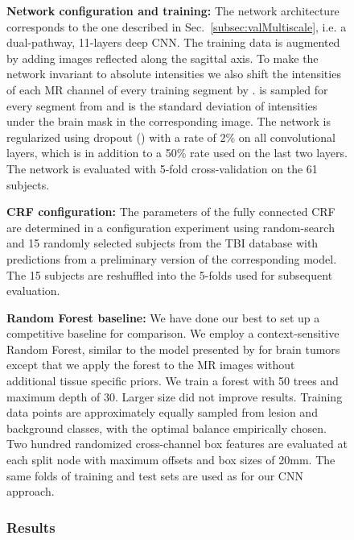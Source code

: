\documentclass[preprint,authoryear,12pt]{elsarticle}
\begin{document}
\begin{figure}[h]
\textbf{Network configuration and training:} The network architecture corresponds to the one described in Sec.~\ref{subsec:valMultiscale}, i.e. a dual-pathway, 11-layers deep CNN. The training data is augmented by adding images reflected along the sagittal axis. To make the network invariant to absolute intensities we also shift the intensities of each MR channel  of every training segment by .  is sampled for every segment from  and  is the standard deviation of intensities under the brain mask in the corresponding image. The network is regularized using dropout (\cite{hinton2012dropout}) with a rate of 2\% on all convolutional layers, which is in addition to a 50\% rate used on the last two layers. The network is evaluated with 5-fold cross-validation on the 61 subjects.

\textbf{CRF configuration:} The parameters of the fully connected CRF are determined in a configuration experiment using random-search and 15 randomly selected subjects from the TBI database with predictions from a preliminary version of the corresponding model. The 15 subjects are reshuffled into the 5-folds used for subsequent evaluation.

\textbf{Random Forest baseline:} We have done our best to set up a competitive baseline for comparison. We employ a context-sensitive Random Forest, similar to the model presented by \cite{Zikic2012} for brain tumors except that we apply the forest to the MR images without additional tissue specific priors. We train a forest with 50 trees and maximum depth of 30. Larger size did not improve results. Training data points are approximately equally sampled from lesion and background classes, with the optimal balance empirically chosen. Two hundred randomized cross-channel box features are evaluated at each split node with maximum offsets and box sizes of 20mm. The same folds of training and test sets are used as for our CNN approach.

\subsubsection{Results}
\label{subsec:resTbi}



\end{figure}
\end{document}
